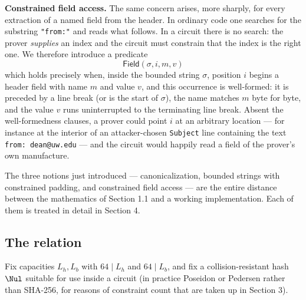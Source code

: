 \documentclass[12pt,reqno]{amsart}
\theoremstyle{definition}
\newcommand{\Field}{\mathsf{Field}}
\begin{document}
\medskip
\noindent\textbf{Constrained field access.} The same concern arises, more
sharply, for every extraction of a named field from the header. In ordinary code
one searches for the substring \texttt{"from:"} and reads what follows. In a
circuit there is no search: the prover \emph{supplies} an index and the circuit
must constrain that the index is the right one. We therefore introduce a
predicate
\[
  \Field(\sigma, i, m, v)
\]
which holds precisely when, inside the bounded string $\sigma$, position $i$
begins a header field with name $m$ and value $v$, and this occurrence is
well-formed: it is preceded by a line break (or is the start of $\sigma$), the
name matches $m$ byte for byte, and the value $v$ runs uninterrupted to the
terminating line break. Absent the well-formedness clauses, a prover could point
$i$ at an arbitrary location --- for instance at the interior of an attacker-chosen
\texttt{Subject} line containing the text \texttt{from: dean@uw.edu} --- and the
circuit would happily read a field of the prover's own manufacture.
 
\begin{remark}
The three notions just introduced --- canonicalization, bounded strings with
constrained padding, and constrained field access --- are the entire distance
between the mathematics of Section 1.1 and a working implementation. Each of
them is treated in detail in Section 4.
\end{remark}
 
\subsection{The relation}
 
Fix capacities $L_{h}, L_{b}$ with $64 \mid L_{h}$ and $64 \mid L_{b}$, and fix a
collision-resistant hash $\Nul$ suitable for use inside a circuit (in practice
Poseidon or Pedersen rather than SHA-256, for reasons of constraint count that
are taken up in Section 3).
 
\end{document}
